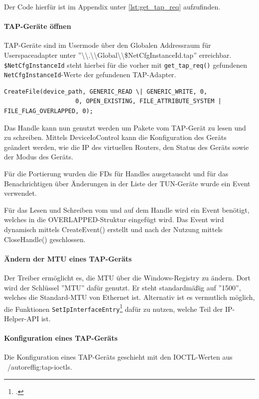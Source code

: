 {Der Code hierfür ist im Appendix unter \autoref{lst:get_tap_req} aufzufinden.

\paragraph{TAP-Geräte öffnen}
TAP-Geräte sind im Usermode über den Globalen Addressraum für Userspaceadapter
unter ''\textbackslash{}\textbackslash{}.\textbackslash{}\textbackslash{}Global\textbackslash{}\textbackslash{}\$NetCfgInstanceId.tap'' erreichbar.
\texttt{\$NetCfgInstanceId} steht hierbei für die vorher mit \texttt{get\_tap\_req()} gefundenen
\texttt{NetCfgInstanceId}-Werte der gefundenen TAP-Adapter.

\begin{lstlisting}[numbers=none]
CreateFile(device_path, GENERIC_READ \| GENERIC_WRITE, 0,
                    0, OPEN_EXISTING, FILE_ATTRIBUTE_SYSTEM | FILE_FLAG_OVERLAPPED, 0);
\end{lstlisting}

Das Handle kann nun genutzt werden um Pakete vom TAP-Gerät zu lesen und zu schreiben.
Mittels DeviceIoControl kann die Konfiguration des Geräts geändert werden,
wie die IP des virtuellen Routers, den Status des Geräts sowie der Modus des Geräts.

Für die Portierung wurden die \acp{FD} für Handles ausgetauscht und für das Benachrichtigen
über Änderungen in der Liste der TUN-Geräte wurde ein Event verwendet.

Für das Lesen und Schreiben vom und auf dem Handle wird ein Event benötigt,
welches in die OVERLAPPED-Struktur eingefügt wird. Das Event wird dynamisch mittels CreateEvent()
erstellt und nach der Nutzung mittels CloseHandle() geschlossen.

\paragraph{Ändern der MTU eines TAP-Geräts}
Der Treiber ermöglicht es,
die \ac{MTU} über die Windows-Registry zu ändern. Dort wird der Schlüssel ''MTU''
dafür genutzt. Er steht standardmäßig auf ''1500'', welches die Standard-\ac{MTU}
von Ethernet ist. Alternativ ist es vermutlich möglich, die Funktionen 
\texttt{SetIpInterfaceEntry}\footcite[][]{_setipinterfaceentry_2016} dafür zu nutzen, welche Teil der IP-Helper-\ac{API} ist.

\paragraph{Konfiguration eines TAP-Geräts}
Die Konfiguration eines TAP-Geräts geschieht mit den IOCTL-Werten aus ~/autoref{fig:tap-ioctls}.

}
